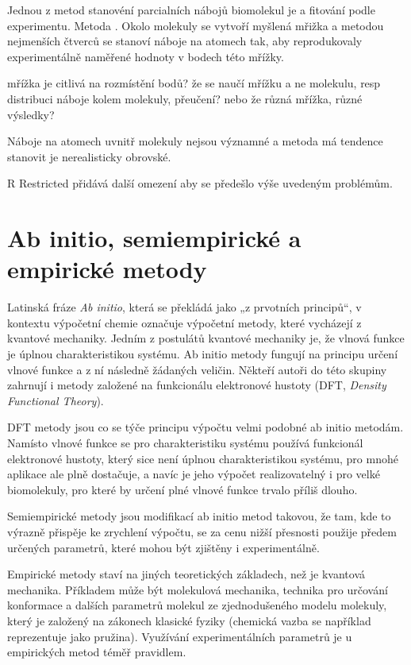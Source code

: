 \documentclass[10pt,draft,oneside]{fithesis2}
\begin{document}
Jednou z metod stanovéní parcialních nábojů biomolekul je a fitování podle experimentu. Metoda . Okolo molekuly se vytvoří myšlená mřižka a metodou nejmenších čtverců se stanoví náboje na atomech tak, aby reprodukovaly experimentálně naměřené hodnoty v bodech této mřížky.

mřížka je citlivá na rozmístění bodů? že se naučí mřížku a ne molekulu, resp distribuci náboje kolem molekuly, přeučení? nebo že různá mřížka, různé výsledky?

Náboje na atomech uvnitř molekuly nejsou významné a metoda má tendence stanovit je nerealisticky obrovské.

R  Restricted přidává další omezení aby se předešlo výše uvedeným problémům.



\section{Ab initio, semiempirické a empirické metody}

Latinská fráze \emph{Ab initio}, která se překládá jako „z prvotních principů“, v kontextu výpočetní chemie označuje výpočetní metody, které vycházejí z kvantové mechaniky. Jedním z postulátů kvantové mechaniky je, že vlnová funkce je úplnou charakteristikou systému. Ab initio metody fungují na principu určení vlnové funkce a z ní následně žádaných veličin. Někteří autoři do této skupiny zahrnují i metody založené na funkcionálu elektronové hustoty (DFT,  \textit{\foreignlanguage{english}{Density Functional Theory}}).

DFT metody jsou co se týče principu výpočtu velmi podobné ab initio metodám. Namísto vlnové funkce se pro charakteristiku systému používá funkcionál elektronové hustoty, který sice není úplnou charakteristikou systému, pro mnohé aplikace ale plně dostačuje, a navíc je jeho výpočet realizovatelný i pro velké biomolekuly, pro které by určení plné vlnové funkce trvalo příliš dlouho.

Semiempirické metody jsou modifikací ab initio metod takovou, že tam, kde to výrazně přispěje ke zrychlení výpočtu, se za cenu nižší přesnosti použije předem určených parametrů, které mohou být zjištěny i experimentálně.

Empirické metody staví na jiných teoretických základech, než je kvantová mechanika. Příkladem může být molekulová mechanika, technika pro určování konformace a dalších parametrů molekul ze zjednodušeného modelu molekuly, který je založený na zákonech klasické fyziky (chemická vazba se například reprezentuje jako pružina). Využívání experimentálních parametrů je u empirických metod téměř pravidlem.
\end{document}
